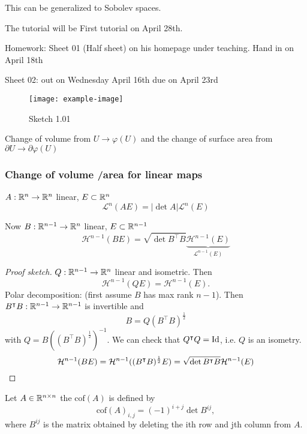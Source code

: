 This can be generalized to Sobolev spaces.




The tutorial will be  First tutorial on  April 28th.

Homework: Sheet 01 (Half sheet) on his homepage under teaching. Hand in on April 18th

Sheet 02: out on Wednesday April 16th due on April 23rd

\begin{figure}[H]\label{fig:1.01}
    \centering
    \texttt{[image: example-image]}
    \caption{Sketch 1.01}
\end{figure}

Change of volume from \(U\to \varphi(U)\) and the change of surface area from \(\partial U \to \partial \varphi(U)\)

\subsubsection*{Change of volume /area for linear maps}

\(A:\mathbb{R}^n\to\mathbb{R}^n\) linear, \(E\subset\mathbb{R}^n\)
\[\mathcal{L}^n(AE)=|\det A|\mathcal{L}^n(E)\]

Now \(B:\mathbb{R}^{n-1}\to\mathbb{R}^n\) linear, \(E\subset\mathbb{R}^{n-1}\)
\[\mathcal{H}^{n-1}(BE)=\sqrt{\det B^\intercal B} \underbrace{\mathcal{H}^{n-1}(E)}_{\mathcal{L}^{n-1}(E)}\]

\begin{proof}[Proof sketch]
    \(Q:\mathbb{R}^{n-1}\to\mathbb{R}^n\) linear and isometric. Then 
    \[\mathcal{H}^{n-1}(QE)=\mathcal{H}^{n-1}(E).\]
    Polar decomposition: (first assume \(B\) has max rank \(n-1\)). Then \(B^\intercal B:\mathbb{R}^{n-1}\to\mathbb{R}^{n-1}\) is invertible and 
    \[B=Q(B^\intercal B)^{\frac{1}{2}}\]
    with \(Q=B\left((B^\intercal B)^{\frac{1}{2}}\right)^{-1}\). We can check that \(Q^\intercal Q=\text{Id}\), i.e. 
    \(Q\) is an isometry.
    \[\mathcal{H}^{n-1}(BE)=\mathcal{H}^{n-1}((B^\intercal B)^{\frac{1}{2}}E)=\sqrt{\det B^\intercal B} \mathcal{H}^{n-1}(E)\qedhere\]
\end{proof}

\begin{definition}\label{def:1.8}
    Let \(A\in \mathbb{R}^{n\times n}\) the  \(\text{cof}(A)\) is defined by 
    \[\text{cof}(A)_{i,j}=(-1)^{i+j}\det B^{ij},\]
    where \(B^{ij}\) is the matrix obtained by deleting the ith row and jth column from \(A\).
\end{definition}

